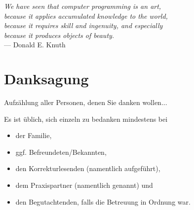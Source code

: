 \cleardoublepage
{}
\begin{flushright}{\slshape
    We have seen that computer programming is an art, \\
    because it applies accumulated knowledge to the world, \\
    because it requires skill and ingenuity, and especially \\
    because it produces objects of beauty.} \\ \medskip
    --- {Donald E. Knuth}\cite{knuth1974}
\end{flushright}

\bigskip

\begingroup
\let\clearpage\relax
\let\cleardoublepage\relax
\let\cleardoublepage\relax
\chapter*{Danksagung}
Aufzählung aller Personen, denen Sie danken wollen...


\noindent Es ist üblich, sich einzeln zu bedanken mindestens bei
\begin{itemize}
    \item der Familie,
    \item ggf. Befreundeten/Bekannten,
    \item den Korrekturlesenden (namentlich aufgeführt),
    \item dem Praxispartner (namentlich genannt) und
    \item den Begutachtenden, falls die Betreuung in Ordnung war.
\end{itemize}
\endgroup